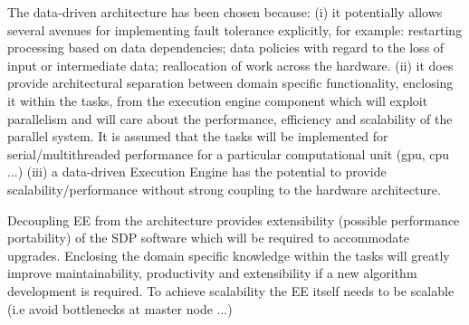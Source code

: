 The data-driven architecture has been chosen because: (i) it potentially allows several avenues for implementing fault tolerance explicitly, for example: restarting processing based on data dependencies; data policies with regard to the loss of input or intermediate data; reallocation of work across the hardware. (ii) it does provide architectural separation between domain specific functionality, enclosing
it within the tasks, from the execution engine component which will exploit parallelism and will care about the performance,
efficiency and scalability of the parallel system. It is assumed that the tasks will be implemented for serial/multithreaded performance for a 
particular computational unit (gpu, cpu ...) (iii) a data-driven Execution Engine has the potential to provide scalability/performance without strong coupling
to the hardware architecture.

Decoupling EE from the architecture provides extensibility (possible performance portability) of the SDP software which will be required to accommodate upgrades. Enclosing the domain specific knowledge within the tasks will greatly improve maintainability, productivity and extensibility if a new algorithm development is required. To achieve scalability the EE itself needs to be scalable (i.e avoid bottlenecks at master node ...)


